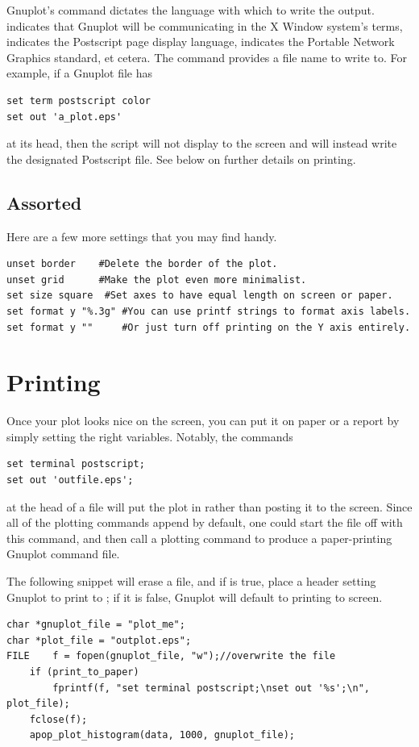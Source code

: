 Gnuplot's  command dictates the language with which to
write the output.  indicates that Gnuplot will be communicating
in the X Window system's terms,  indicates the Postscript
page display language,  indicates the Portable Network Graphics
standard, et cetera. The  command provides a file name to
write to. For example, if a Gnuplot file has 
\begin{lstlisting}
set term postscript color
set out 'a_plot.eps'
\end{lstlisting}
at its head, then the script will not display to the screen and will
instead write the designated Postscript file. See below on further
details on printing.

\subsection{Assorted} Here are a few more settings that you may find
handy.
\begin{lstlisting}
unset border    #Delete the border of the plot.
unset grid      #Make the plot even more minimalist.
set size square  #Set axes to have equal length on screen or paper.
set format y "%.3g" #You can use printf strings to format axis labels.
set format y ""     #Or just turn off printing on the Y axis entirely.
\end{lstlisting}


\section{Printing}  
Once your plot looks nice on the screen, you can put it on paper or a
report by simply setting the right variables. Notably, the commands
\begin{lstlisting}
set terminal postscript;
set out 'outfile.eps';
\end{lstlisting}

at the head of a file will put the plot in  rather
than posting it to the screen. Since all of the plotting commands append
by default, one could start the file off with this command, and then
call a plotting command to produce a paper-printing Gnuplot command file.

The following snippet will erase a file, and
if  is true, place a header setting Gnuplot to
print to ; if it is false, Gnuplot will default
to printing to screen.

\begin{lstlisting}
char *gnuplot_file = "plot_me";
char *plot_file = "outplot.eps";
FILE    f = fopen(gnuplot_file, "w");//overwrite the file
    if (print_to_paper)
        fprintf(f, "set terminal postscript;\nset out '%s';\n", plot_file);
    fclose(f);
    apop_plot_histogram(data, 1000, gnuplot_file);
\end{lstlisting}

